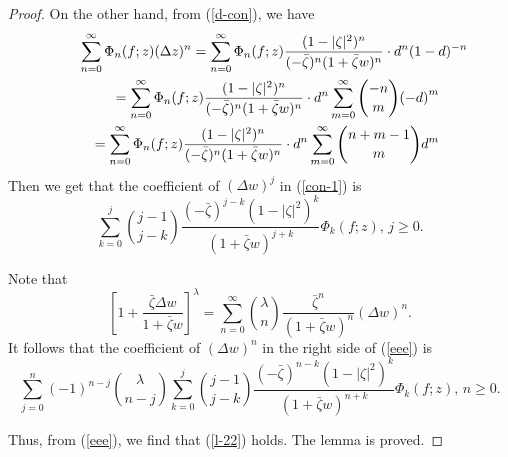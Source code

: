 \documentclass[10pt]{amsart}
\theoremstyle{definition}
\theoremstyle{remark}
\numberwithin{equation}{section}
\begin{document}
\begin{proof}
On the other hand, from (\ref{d-con}), we have 
\begin{eqnarray}\label{con-1}
\lefteqn{\sum_{n=0}^{\infty}\Phi_{n}(f; z)(\Delta z)^n=\sum_{n=0}^{\infty}\Phi_{n}(f; z)\frac{(1-|\zeta|^2)^n}{(-\bar{\zeta})^n(1+\bar{\zeta}w)^n}\cdot d^n {(1-d)^{-n}}}\nonumber \\
&&= \sum_{n=0}^{\infty}\Phi_{n}(f; z) \frac{(1-|\zeta|^2)^n}{(-\bar{\zeta})^n(1+\bar{\zeta}w)^n}\cdot d^n \sum_{m=0}^{\infty}\binom{-n}{m}{(-d)}^{m} \nonumber  \\
&&= \sum_{n=0}^{\infty}\Phi_{n}(f; z) \frac{(1-|\zeta|^2)^n}{(-\bar{\zeta})^n(1+\bar{\zeta}w)^n}\cdot d^n \sum_{m=0}^{\infty}\binom{n+m-1}{m}{d}^{m}
\end{eqnarray}
Then we get  that the coefficient of $(\Delta w)^j$ in (\ref{con-1}) is 
\begin{equation}
\sum_{k=0}^{j}\binom{j-1}{j-k}\frac{(-\bar{\zeta})^{j-k}(1-|\zeta|^2)^{k}}{(1+\bar{\zeta}w)^{j+k}}\Phi_{k}(f; z), \, j\geq 0. \nonumber
\end{equation}

Note that 
$$\left[1+\frac{\bar{\zeta} \Delta w }{1+\bar{\zeta}w}\right]^{\lambda}=\sum_{n=0}^{\infty}\binom{\lambda}{n} \frac{{\bar{\zeta}}^n }{(1+\bar{\zeta}w)^n}(\Delta w)^n.$$
It follows that  the coefficient of $(\Delta w)^n$ in the right side of (\ref{eee}) is 
\begin{equation}
\sum_{j=0}^{n}(-1)^{n-j}\binom{\lambda}{n-j}\sum_{k=0}^{j}\binom{j-1}{j-k}\frac{(-\bar{\zeta})^{n-k}(1-|\zeta|^2)^{k}}{(1+\bar{\zeta}w)^{n+k}}\Phi_{k}(f; z), \, n\geq 0.
\end{equation}

Thus, from (\ref{eee}),  we find that (\ref{l-22}) holds. The lemma is proved. 
\end{proof}
\end{document}
